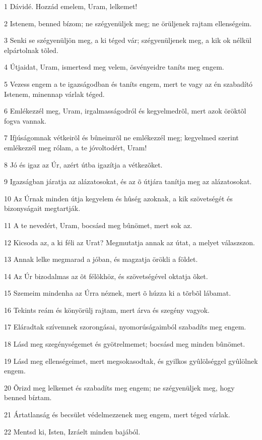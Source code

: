 \par 1 Dávidé. Hozzád emelem, Uram, lelkemet!
\par 2 Istenem, benned bízom; ne szégyenüljek meg; ne örüljenek rajtam ellenségeim.
\par 3 Senki se szégyenüljön meg, a ki téged vár; szégyenüljenek meg, a kik ok nélkül elpártolnak tõled.
\par 4 Útjaidat, Uram, ismertesd meg velem, ösvényeidre taníts meg engem.
\par 5 Vezess engem a te igazságodban és taníts engem, mert te vagy az én szabadító Istenem, minennap várlak téged.
\par 6 Emlékezzél meg, Uram, irgalmasságodról és kegyelmedrõl, mert azok öröktõl fogva vannak.
\par 7 Ifjúságomnak vétkeirõl és bûneimrõl ne emlékezzél meg; kegyelmed szerint emlékezzél meg rólam, a te jóvoltodért, Uram!
\par 8 Jó és igaz az Úr, azért útba igazítja a vétkezõket.
\par 9 Igazságban járatja az alázatosokat, és az õ útjára tanítja meg az alázatosokat.
\par 10 Az Úrnak minden útja kegyelem és hûség azoknak, a kik szövetségét és bizonyságait megtartják.
\par 11 A te nevedért, Uram, bocsásd meg bûnömet, mert sok az.
\par 12 Kicsoda az, a ki féli az Urat? Megmutatja annak az útat, a melyet válaszszon.
\par 13 Annak lelke megmarad a jóban, és magzatja örökli a földet.
\par 14 Az Úr bizodalmas az õt félõkhöz, és szövetségével oktatja õket.
\par 15 Szemeim mindenha az Úrra néznek, mert õ húzza ki a tõrbõl lábamat.
\par 16 Tekints reám és könyörülj rajtam, mert árva és szegény vagyok.
\par 17 Eláradtak szívemnek szorongásai, nyomorúságaimból szabadíts meg engem.
\par 18 Lásd meg szegénységemet és gyötrelmemet; bocsásd meg minden bûnömet.
\par 19 Lásd meg ellenségeimet, mert megsokasodtak, és gyilkos gyûlölséggel gyûlölnek engem.
\par 20 Õrizd meg lelkemet és szabadíts meg engem; ne szégyenüljek meg, hogy benned bíztam.
\par 21 Ártatlanság és becsület védelmezzenek meg engem, mert téged várlak.
\par 22 Mentsd ki, Isten, Izráelt minden bajából.

